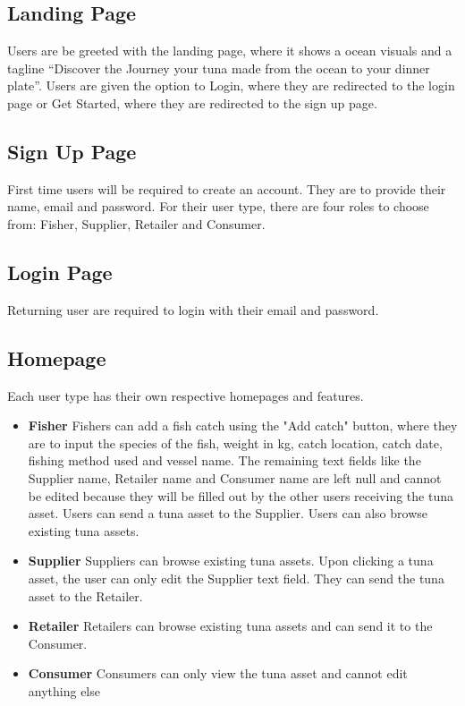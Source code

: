 \subsection{Landing Page}
Users are be greeted with the landing page, where it shows a ocean visuals and a tagline “Discover the Journey your tuna made from the ocean to your dinner plate”. Users are given the option to Login, where they are redirected to the login page or Get Started, where they are redirected to the sign up page. 

\subsection{Sign Up Page}
First time users will be required to create an account. They are to provide their name, email and password. For their user type, there are four roles to choose from: Fisher, Supplier, Retailer and Consumer. 

\subsection{Login Page}
Returning user are required to login with their email and password.

\subsection{Homepage}
Each user type has their own respective homepages and features.
	\begin{itemize}
		\item \textbf{Fisher}
		Fishers can add a fish catch using the "Add catch" button, where they are to input the species of the fish, weight in kg, catch location, catch date, fishing method used and vessel name. The remaining text fields like the Supplier name, Retailer name and Consumer name are left null and cannot be edited because they will be filled out by the other users receiving the tuna asset. Users can send a tuna asset to the Supplier. Users can also browse existing tuna assets. 
		\item \textbf{Supplier}
		Suppliers can browse existing tuna assets. Upon clicking a tuna asset, the user can only edit the Supplier text field. They can send the tuna asset to the Retailer.
		\item \textbf{Retailer}
		Retailers can browse existing tuna assets and can send it to the Consumer.
		\item \textbf{Consumer}
		Consumers can only view the tuna asset and cannot edit anything else
	\end{itemize}
	
